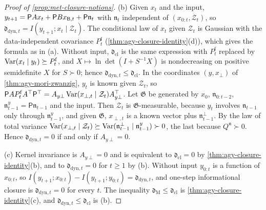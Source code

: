 \begin{proof}[Proof of \cref{prop:met-closure-notions}]
(b) Given $x_t$ and the input, $y_{t+1}=\mathsf PAx_t+\mathsf PBx_{\mathsf{B},t}+\mathsf P\mathfrak n_t$ with $\mathfrak n_t$ independent of $(x_{0:t},\mathcal Z_t)$, so $\mathfrak d_{\mathrm{dyn},t}=I(y_{t+1};x_t\mid\mathcal Z_t)$. The conditional law of $x_t$ given $\mathcal Z_t$ is Gaussian with the data-independent covariance $P^{\mathrm f}_t$ (\cref{thm:agy-closure-identity}(d)), which gives the formula as in (a). Without input, $\mathfrak d_{\mathrm{cl}}$ is the same expression with $P^{\mathrm f}_t$ replaced by $\operatorname{Var}(x_t\mid y_t)\succeq P^{\mathrm f}_t$, and $X\mapsto\ln\det(I+S^{-1}X)$ is nondecreasing on positive semidefinite $X$ for $S\succ0$; hence $\mathfrak d_{\mathrm{dyn},t}\le\mathfrak d_{\mathrm{cl}}$. In the coordinates $(y,x_\perp)$ of \cref{thm:agy-mori-zwanzig}, $y_t$ is known given $\mathcal Z_t$, so $\mathsf PAP^{\mathrm f}_tA^\top\mathsf P^\top=A_{y\perp}\operatorname{Var}(x_{\perp,t}\mid\mathcal Z_t)A_{y\perp}^\top$. Let $\mathfrak G$ be generated by $x_0$, $\mathfrak n_{0:t-2}$, $\mathfrak n^y_{t-1}=\mathsf P\mathfrak n_{t-1}$ and the input. Then $\mathcal Z_t$ is $\mathfrak G$-measurable, because $y_t$ involves $\mathfrak n_{t-1}$ only through $\mathfrak n^y_{t-1}$, and given $\mathfrak G$, $x_{\perp,t}$ is a known vector plus $\mathfrak n^\perp_{t-1}$. By the law of total variance $\operatorname{Var}(x_{\perp,t}\mid\mathcal Z_t)\succeq\operatorname{Var}(\mathfrak n^\perp_{t-1}\mid\mathfrak n^y_{t-1})\succ0$, the last because $Q^{\mathfrak n}\succ0$. Hence $\mathfrak d_{\mathrm{dyn},t}=0$ if and only if $A_{y\perp}=0$.

(c) Kernel invariance is $A_{y\perp}=0$ and is equivalent to $\mathfrak d_{\mathrm{cl}}=0$ by \cref{thm:agy-closure-identity}(b), and to $\mathfrak d_{\mathrm{dyn},t}=0$ for $t\ge1$ by (b). Without input $y_{0:t}$ is a function of $x_{0:t}$, so $I(y_{t+1};x_{0:t})-I(y_{t+1};y_{0:t})=\mathfrak d_{\mathrm{dyn},t}$, and one-step informational closure is $\mathfrak d_{\mathrm{dyn},t}=0$ for every $t$. The inequality $\mathfrak d_{\mathrm M}\le\mathfrak d_{\mathrm{cl}}$ is \cref{thm:agy-closure-identity}(c), and $\mathfrak d_{\mathrm{dyn},t}\le\mathfrak d_{\mathrm{cl}}$ is (b).
\end{proof}

